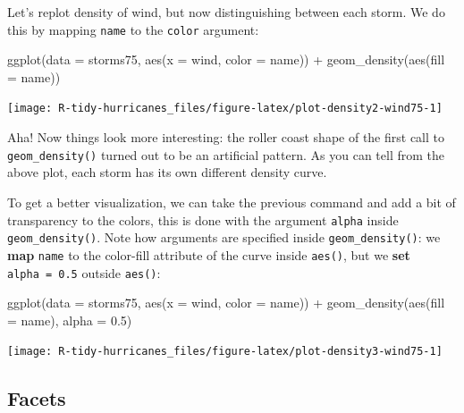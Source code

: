 \documentclass[
]{book}
\newenvironment{Shaded}{\begin{snugshade}}{\end{snugshade}}
\newcommand{\AttributeTok}[1]{\textcolor[rgb]{0.77,0.63,0.00}{#1}}
\newcommand{\FloatTok}[1]{\textcolor[rgb]{0.00,0.00,0.81}{#1}}
\newcommand{\FunctionTok}[1]{\textcolor[rgb]{0.00,0.00,0.00}{#1}}
\newcommand{\NormalTok}[1]{#1}
\newcommand{\SpecialCharTok}[1]{\textcolor[rgb]{0.00,0.00,0.00}{#1}}
\begin{document}
Let's replot density of wind, but now distinguishing between each storm. We
do this by mapping \texttt{name} to the \texttt{color} argument:

\begin{Shaded}
\begin{Highlighting}[]
\FunctionTok{ggplot}\NormalTok{(}\AttributeTok{data =}\NormalTok{ storms75, }\FunctionTok{aes}\NormalTok{(}\AttributeTok{x =}\NormalTok{ wind, }\AttributeTok{color =}\NormalTok{ name)) }\SpecialCharTok{+}
  \FunctionTok{geom\_density}\NormalTok{(}\FunctionTok{aes}\NormalTok{(}\AttributeTok{fill =}\NormalTok{ name))}
\end{Highlighting}
\end{Shaded}

\begin{center}\texttt{[image: R-tidy-hurricanes\_files/figure-latex/plot-density2-wind75-1]} \end{center}

Aha! Now things look more interesting: the roller coast shape of the first call
to \texttt{geom\_density()} turned out to be an artificial pattern. As you can tell
from the above plot, each storm has its own different density curve.

To get a better visualization, we can take the previous command and add a bit
of transparency to the colors, this is done with the argument \texttt{alpha} inside
\texttt{geom\_density()}. Note how arguments are specified inside \texttt{geom\_density()}:
we \textbf{map} \texttt{name} to the color-fill attribute of the curve inside \texttt{aes()}, but
we \textbf{set} \texttt{alpha\ =\ 0.5} outside \texttt{aes()}:

\begin{Shaded}
\begin{Highlighting}[]
\FunctionTok{ggplot}\NormalTok{(}\AttributeTok{data =}\NormalTok{ storms75, }\FunctionTok{aes}\NormalTok{(}\AttributeTok{x =}\NormalTok{ wind, }\AttributeTok{color =}\NormalTok{ name)) }\SpecialCharTok{+}
  \FunctionTok{geom\_density}\NormalTok{(}\FunctionTok{aes}\NormalTok{(}\AttributeTok{fill =}\NormalTok{ name), }\AttributeTok{alpha =} \FloatTok{0.5}\NormalTok{)}
\end{Highlighting}
\end{Shaded}

\begin{center}\texttt{[image: R-tidy-hurricanes\_files/figure-latex/plot-density3-wind75-1]} \end{center}

\hypertarget{facets}{%
\subsection{Facets}\label{facets}}
\end{document}
